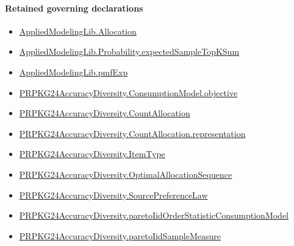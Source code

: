 \documentclass[10pt]{article}
\begin{document}
\paragraph{Retained governing declarations}
\begin{itemize}\raggedright
\item \hyperlink{governing-declaration-6972368b41f26c5a}{Applied\allowbreak{}Modeling\allowbreak{}Lib.\allowbreak{}Allocation}
\item \hyperlink{governing-declaration-ce2e2b3f3ae2c88d}{Applied\allowbreak{}Modeling\allowbreak{}Lib.\allowbreak{}Probability.\allowbreak{}expected\allowbreak{}Sample\allowbreak{}Top\allowbreak{}K\allowbreak{}Sum}
\item \hyperlink{governing-declaration-8e4b4389a4f6454b}{Applied\allowbreak{}Modeling\allowbreak{}Lib.\allowbreak{}pmf\allowbreak{}Exp}
\item \hyperlink{governing-declaration-3ab045ef5e79a864}{PRPKG24\allowbreak{}Accuracy\allowbreak{}Diversity.\allowbreak{}Consumption\allowbreak{}Model.\allowbreak{}objective}
\item \hyperlink{governing-declaration-4fbd8fa467bd5d78}{PRPKG24\allowbreak{}Accuracy\allowbreak{}Diversity.\allowbreak{}Count\allowbreak{}Allocation}
\item \hyperlink{paper-prerequisite-29fb13a9ce74aef5}{PRPKG24\allowbreak{}Accuracy\allowbreak{}Diversity.\allowbreak{}Count\allowbreak{}Allocation.\allowbreak{}representation}
\item \hyperlink{governing-declaration-562ef32e180a12be}{PRPKG24\allowbreak{}Accuracy\allowbreak{}Diversity.\allowbreak{}Item\allowbreak{}Type}
\item \hyperlink{governing-declaration-98821e74d0c4230b}{PRPKG24\allowbreak{}Accuracy\allowbreak{}Diversity.\allowbreak{}Optimal\allowbreak{}Allocation\allowbreak{}Sequence}
\item \hyperlink{governing-declaration-e662f313179ba80f}{PRPKG24\allowbreak{}Accuracy\allowbreak{}Diversity.\allowbreak{}Source\allowbreak{}Preference\allowbreak{}Law}
\item \hyperlink{governing-declaration-9af16f6791d21c9c}{PRPKG24\allowbreak{}Accuracy\allowbreak{}Diversity.\allowbreak{}pareto\allowbreak{}Iid\allowbreak{}Order\allowbreak{}Statistic\allowbreak{}Consumption\allowbreak{}Model}
\item \hyperlink{governing-declaration-ea124ab678db9ab9}{PRPKG24\allowbreak{}Accuracy\allowbreak{}Diversity.\allowbreak{}pareto\allowbreak{}Iid\allowbreak{}Sample\allowbreak{}Measure}
\end{itemize}
\end{document}
